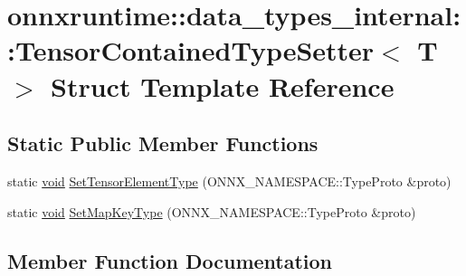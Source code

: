 \hypertarget{structonnxruntime_1_1data__types__internal_1_1TensorContainedTypeSetter_3_01T_01_4}{}\section{onnxruntime\+:\+:data\+\_\+types\+\_\+internal\+:\+:Tensor\+Contained\+Type\+Setter$<$ T $>$ Struct Template Reference}
\label{structonnxruntime_1_1data__types__internal_1_1TensorContainedTypeSetter_3_01T_01_4}
\subsection*{Static Public Member Functions}
\begin{DoxyCompactItemize}
\item 
static \mbox{\hyperlink{mlasi_8h_a88f941d423cb2a819b70a1358982b1a6}{void}} \mbox{\hyperlink{structonnxruntime_1_1data__types__internal_1_1TensorContainedTypeSetter_3_01T_01_4_a4e06eb31fc2421f7e6c66e0c758538c5}{Set\+Tensor\+Element\+Type}} (O\+N\+N\+X\+\_\+\+N\+A\+M\+E\+S\+P\+A\+C\+E\+::\+Type\+Proto \&proto)
\item 
static \mbox{\hyperlink{mlasi_8h_a88f941d423cb2a819b70a1358982b1a6}{void}} \mbox{\hyperlink{structonnxruntime_1_1data__types__internal_1_1TensorContainedTypeSetter_3_01T_01_4_a87b3d430f2d172c0b8c880a0b0245c70}{Set\+Map\+Key\+Type}} (O\+N\+N\+X\+\_\+\+N\+A\+M\+E\+S\+P\+A\+C\+E\+::\+Type\+Proto \&proto)
\end{DoxyCompactItemize}


\subsection{Member Function Documentation}
\mbox{\label{structonnxruntime_1_1data__types__internal_1_1TensorContainedTypeSetter_3_01T_01_4_a87b3d430f2d172c0b8c880a0b0245c70}} 
